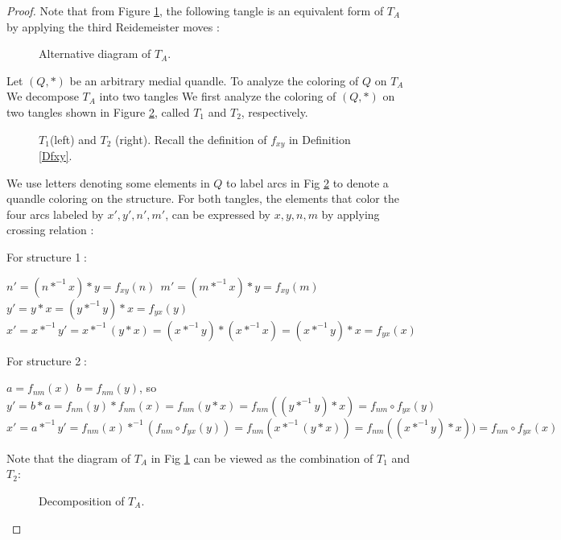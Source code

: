 \documentclass[10pt,a4paper]{amsart}
\begin{document}
\begin{proof} \label{proflemma1}
     Note that from Figure \ref{TAtransf},  the following tangle is an equivalent form of $T_A$ by applying the third Reidemeister moves  : 
\begin{figure}[h]   \centering   
\caption{{Alternative diagram of $T_A$.} } \label{TAtransf}
\end{figure}
  
Let $(Q,*)$ be an arbitrary medial quandle. To analyze the coloring of $Q$ on $T_A$ We decompose $T_A$ into two tangles  We first analyze the coloring of $(Q,*)$ on two tangles shown in Figure \ref{fig:colortwostr}, called  $T_1$ and $T_2$, respectively. 
\begin{figure}[H]    \centering
  
 \caption{$T_1$(left) and $T_2$ (right). Recall the definition of $f_{xy}$ in Definition \ref{Dfxy}. }
    \label{fig:colortwostr} \end{figure}
We use letters denoting some elements in $Q$ to label arcs in Fig \ref{fig:colortwostr} to denote a quandle coloring on the structure. For both tangles, the elements that color the four arcs labeled by $x',y',n',m'$, can be expressed by $x,y,n,m$ by applying crossing relation : 
    

For structure \textcircled{1}:\begin{center}
    $n'=(n*^{-1}x)*y=f_{xy}(n)~~m'=(m*^{-1}x)*y=f_{xy}(m)$\\  $y'=y*x=(y*^{-1}y)*x=f_{yx}(y)$\\ $x'=x*^{-1}y'=x*^{-1}(y*x)=(x*^{-1}y)*(x*^{-1}x)=(x*^{-1}y)*x=f_{yx}(x)$ \end{center}

For structure \textcircled{2}: \begin{center}
     $a=f_{nm}(x)~~b=f_{nm}(y)$, so\\
$y'=b*a=f_{nm}(y)*f_{nm}(x)=f_{nm}(y*x)=f_{nm}((y*^{-1}y)*x)=f_{nm}\circ f_{yx}(y)$\\
$x'=a*^{-1}y'=f_{nm}(x)*^{-1}(f_{nm}\circ f_{yx}(y))=f_{nm}(x*^{-1}(y*x))=f_{nm}((x*^{-1}y)*x))=f_{nm}\circ f_{yx}(x)$ \end{center}

 Note that the diagram of $T_A$ in Fig \ref{TAtransf} can be viewed as the combination of $T_1$ and $T_2$:
  \begin{figure}[H] \centering  
  \caption{Decomposition of $T_A$.} \label{TAascombine} \end{figure}


\end{proof}
\end{document}
